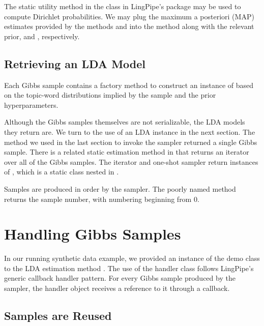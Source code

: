 The static utility method 
in the class  in LingPipe's  package may
be used to compute Dirichlet probabilities.  We may plug the maximum a
posteriori (MAP) estimates provided by the methods
 and  into the
 method along with the relevant prior,
 and , respectively.



\subsection{Retrieving an LDA Model}

Each Gibbs sample contains a factory method  to construct
an instance of  based on the
topic-word distributions implied by the sample and the prior
hyperparameters.  

Although the Gibbs samples themselves are not serializable, the LDA
models they return are.  We turn to the use of an LDA instance in the
next section.
The method we used in the last section to invoke the sampler returned
a single Gibbs sample.  There is a related static estimation method in
 that returns an iterator over all of
the Gibbs samples.  The iterator and one-shot sampler return instances
of , which is a static class nested in
.

Samples are produced in order by the sampler.  The poorly named method
 returns the sample number, with numbering beginning
from 0.


\section{Handling Gibbs Samples}

In our running synthetic data example, we provided an instance of the
demo class  to the LDA estimation
method .  The use of the handler class follows
LingPipe's generic callback handler pattern.  For every
Gibbs sample produced by the sampler, the handler object receives
a reference to it through a callback.

\subsection{Samples are Reused}

